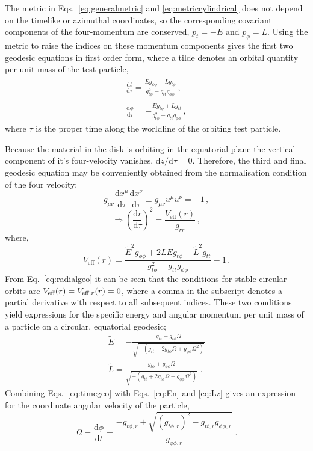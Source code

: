 The metric in Eqs.\ \ref{eq:generalmetric} and \ref{eq:metriccylindrical} does not depend on the timelike or azimuthal coordinates, so the corresponding covariant components of the four-momentum are conserved, $p_{t}=-E$ and $p_{\phi}=L$. Using the metric to raise the indices on these momentum components gives the first two geodesic equations in first order form, where a tilde denotes an orbital quantity per unit mass of the test particle,
\begin{eqnarray}\label{eq:timegeo} 
\frac{\textrm{d}t}{\textrm{d}\tau} 	=\frac{\tilde{E}g_{\phi \phi}+\tilde{L}g_{t \phi}}{g_{t \phi}^{2}-g_{tt}g_{\phi \phi}}\, , \nonumber \\ 
\frac{\textrm{d}\phi}{\textrm{d}\tau} 	=-\frac{\tilde{E}g_{t\phi}+\tilde{L}g_{tt}}{g_{t \phi}^{2}-g_{tt}g_{\phi \phi}}\, ,
\end{eqnarray}
where $\tau$ is the proper time along the worldline of the orbiting test particle.

Because the material in the disk is orbiting in the equatorial plane the vertical component of it's four-velocity vanishes, $\textrm{d}z/\textrm{d}\tau=0$. Therefore, the third and final geodesic equation may be conveniently obtained from the normalisation condition of the four velocity;
\begin{equation}
\label{eq:norm4velocity}g_{\mu\nu}\frac{\textrm{d}x^{\mu}}{\textrm{d}\tau}\frac{\textrm{d}x^{\nu}}{\textrm{d}\tau}\equiv g_{\mu\nu}u^{\mu}u^{\nu}=-1 \, , 
\end{equation}
\begin{equation}
\label{eq:radialgeo}\Rightarrow \left(\frac{\textrm{d}r}{\textrm{d}\tau}\right)^{2} = \frac{V_{\textrm{eff}}(r)}{g_{rr}} \, , 
\end{equation}
where,
\begin{equation} V_{\textrm{eff}}(r)= \frac{\tilde{E}^{2}g_{\phi \phi}+2\tilde{L}\tilde{E}g_{t\phi}+\tilde{L}^{2}g_{tt}}{g_{t\phi}^{2}-g_{tt}g_{\phi\phi}}-1 \, . \end{equation} 
From Eq.\ \ref{eq:radialgeo} it can be seen that the conditions for stable circular orbits are $V_{\textrm{eff}}(r)\nobreak=\nobreak V_{\textrm{eff},r}(r)\nobreak=\nobreak0$, where a comma in the subscript denotes a partial derivative with respect to all subsequent indices. These two conditions yield expressions for the specific energy and angular momentum per unit mass of a particle on a circular, equatorial geodesic;
\begin{eqnarray} 
\tilde{E} = -\frac{g_{tt}+g_{t\phi}\Omega}{\sqrt{-\left( g_{tt}+2g_{t\phi}\Omega+g_{\phi\phi}\Omega^{2} \right)}} \label{eq:En} \\
\tilde{L} = \frac{g_{t\phi}+g_{\phi\phi}\Omega}{\sqrt{-\left( g_{tt}+2g_{t\phi}\Omega+g_{\phi\phi}\Omega^{2} \right)}}\; . \label{eq:Lz}
\end{eqnarray}
Combining Eqs.\ \ref{eq:timegeo} with Eqs.\ \ref{eq:En} and \ref{eq:Lz} gives an expression for the coordinate angular velocity of the particle,
\begin{equation}\label{eq:omega} \Omega = \frac{\textrm{d}\phi}{\textrm{d}t} = \frac{-g_{t\phi ,r}+\sqrt{ \left( g_{t\phi,r} \right)^{2} - g_{tt,r} g_{\phi\phi ,r} }}{g_{\phi \phi , r}} \; . \end{equation}

